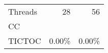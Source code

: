 \begin{tabular}{lrr}
\toprule
Threads &    28 &    56 \\
CC     &       &       \\
\midrule
TICTOC & 0.00\% & 0.00\% \\
\bottomrule
\end{tabular}
